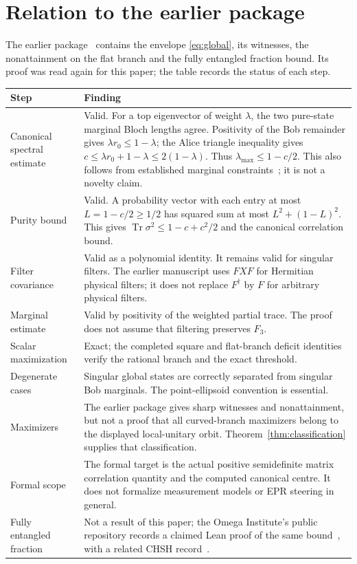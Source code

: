 \documentclass[11pt,a4paper]{article}
\theoremstyle{remark}\newtheorem{remark}[theorem]{Remark}
\newcommand{\Tr}{\operatorname{Tr}}
\begin{document}
\appendix


\section{Relation to the earlier package}\label{sec:audit}
The earlier package~\cite{earlier} contains the envelope
\eqref{eq:global}, its witnesses, the nonattainment on the flat branch and
the fully entangled fraction bound. Its proof was read again for this
paper; the table records the status of each step.

\begin{longtable}{p{.24\linewidth}p{.69\linewidth}}
\toprule Step & Finding\\\midrule\endhead
Canonical spectral estimate & Valid. For a top eigenvector of weight $\lambda$,
the two pure-state marginal Bloch lengths agree. Positivity of the Bob
remainder gives $\lambda r_0\leq1-\lambda$; the Alice triangle inequality
gives $c\leq\lambda r_0+1-\lambda\leq2(1-\lambda)$. Thus
$\lambda_{\max}\leq1-c/2$. This also follows from established marginal
constraints~\cite{bravyi}; it is not a novelty claim.\\
Purity bound & Valid. A probability vector with each entry at most
$L=1-c/2\geq1/2$ has squared sum at most $L^2+(1-L)^2$.
This gives $\Tr\sigma^2\leq1-c+c^2/2$ and the canonical correlation bound.\\
Filter covariance & Valid as a polynomial identity. It remains valid for
singular filters. The earlier manuscript uses $FXF$ for Hermitian physical
filters; it does not replace $F^\dagger$ by $F$ for arbitrary physical
filters.\\
Marginal estimate & Valid by positivity of the weighted partial trace.
The proof does not assume that filtering preserves $F_3$.\\
Scalar maximization & Exact; the completed square and flat-branch deficit
identities verify the rational branch and the exact threshold.\\
Degenerate cases & Singular global states are correctly separated from
singular Bob marginals. The point-ellipsoid convention is essential.\\
Maximizers & The earlier package gives sharp witnesses and nonattainment,
but not a proof that all curved-branch maximizers belong to the displayed
local-unitary orbit. Theorem~\ref{thm:classification} supplies that
classification.\\
Formal scope & The formal target is the actual positive semidefinite
matrix correlation quantity and the computed canonical centre. It does not
formalize measurement models or EPR steering in general.\\
Fully entangled fraction & Not a result of this paper; the Omega
Institute's public repository records a claimed Lean proof of the same
bound~\cite{omegafef}, with a related CHSH record~\cite{omegachsh}.\\
\bottomrule
\end{longtable}
\end{document}
